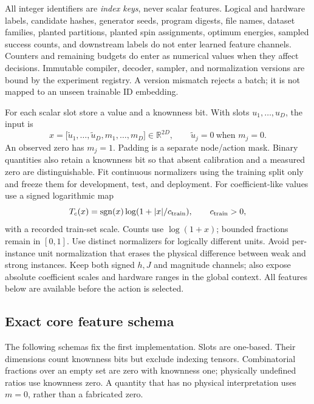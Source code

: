 All integer identifiers are \emph{index keys}, never scalar features. Logical and hardware labels, candidate hashes, generator seeds, program digests, file names, dataset families, planted partitions, planted spin assignments, optimum energies, sampled success counts, and downstream labels do not enter learned feature channels. Counters and remaining budgets do enter as numerical values when they affect decisions. Immutable compiler, decoder, sampler, and normalization versions are bound by the experiment registry. A version mismatch rejects a batch; it is not mapped to an unseen trainable ID embedding.

For each scalar slot store a value and a knownness bit. With slots \(u_1,\ldots,u_D\), the input is
\[
 x=\bigl[\widetilde u_1,\ldots,\widetilde u_D,
         m_1,\ldots,m_D\bigr]\in\mathbb R^{2D},
 \qquad \widetilde u_j=0\ \text{when }m_j=0.
\]
An observed zero has \(m_j=1\). Padding is a separate node/action mask. Binary quantities also retain a knownness bit so that absent calibration and a measured zero are distinguishable. Fit continuous normalizers using the training split only and freeze them for development, test, and deployment. For coefficient-like values use a signed logarithmic map
\[
 T_c(x)=\operatorname{sgn}(x)\log(1+|x|/c_{\rm train}),
 \qquad c_{\rm train}>0,
\]
with a recorded train-set scale. Counts use \(\log(1+x)\); bounded fractions remain in \([0,1]\). Use distinct normalizers for logically different units. Avoid per-instance unit normalization that erases the physical difference between weak and strong instances. Keep both signed \(h,J\) and magnitude channels; also expose absolute coefficient scales and hardware ranges in the global context. All features below are available before the action is selected.

\subsection{Exact core feature schema}

The following schemas fix the first implementation. Slots are one-based. Their dimensions count knownness bits but exclude indexing tensors. Combinatorial fractions over an empty set are zero with knownness one; physically undefined ratios use knownness zero. A quantity that has no physical interpretation uses \(m=0\), rather than a fabricated zero.

